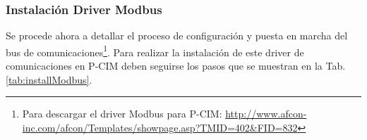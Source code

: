 \subsubsection{Instalación Driver Modbus}
Se procede ahora a detallar el  proceso de configuración y puesta en marcha 
del bus de comunicaciones\footnote{Para descargar el driver Modbus para P-CIM:
\url{http://www.afcon-inc.com/afcon/Templates/showpage.asp?TMID=402&FID=832}}.
Para realizar la instalación de este driver de comunicaciones en P-CIM deben
seguirse los pasos que se muestran en la Tab. \ref{tab:installModbus}.
